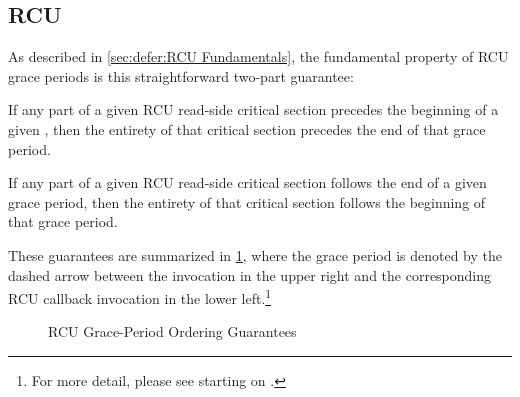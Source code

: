 \subsection{RCU}
\label{sec:memorder:RCU}

As described in
\cref{sec:defer:RCU Fundamentals},
the fundamental property of RCU grace periods is this straightforward
two-part guarantee:
\begin{enumerate*}[(1)]
\item If any part of a given RCU read-side critical section precedes
the beginning of a given , then the entirety of that
critical section precedes the end of that grace period.
\item If any part of a given RCU read-side critical section follows
the end of a given grace period, then the entirety of that
critical section follows the beginning of that grace period.
\end{enumerate*}
These guarantees are summarized in
\cref{fig:memorder:RCU Grace-Period Ordering Guarantees},
where the grace period is denoted by the dashed arrow between the
 invocation in the upper right and the corresponding
RCU callback invocation in the lower left.\footnote{
	For more detail, please see
	starting on
	.}

\begin{figure}
\centering
{}
\caption{RCU Grace-Period Ordering Guarantees}
\label{fig:memorder:RCU Grace-Period Ordering Guarantees}
\end{figure}

